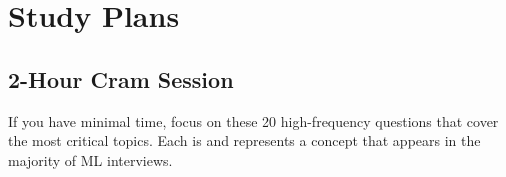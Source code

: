 \section{Study Plans}
\label{sec:qi_study_plans}

\subsection{2-Hour Cram Session}

If you have minimal time, focus on these 20 high-frequency questions that cover the most critical topics. Each is \freqhigh{} and represents a concept that appears in the majority of ML interviews.

